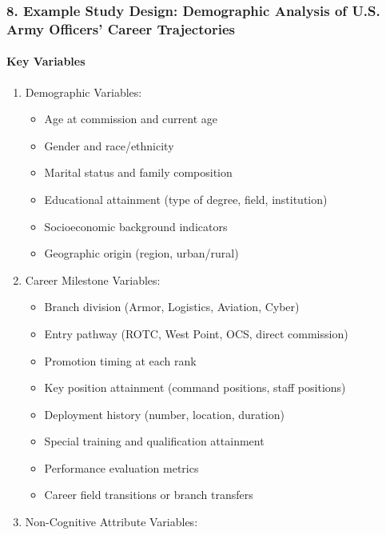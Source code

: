 \documentclass[./main.tex]{subfiles}
\begin{document}
\subsubsection{8. Example Study Design: Demographic Analysis of U.S. Army
Officers' Career
Trajectories}\label{example-study-design-demographic-analysis-of-u.s.-army-officers-career-trajectories}

\paragraph{Key Variables}\label{key-variables}

\begin{enumerate}
\def\labelenumi{\arabic{enumi}.}
\tightlist
\item
  Demographic Variables:

  \begin{itemize}
  \tightlist
  \item
    Age at commission and current age
  \item
    Gender and race/ethnicity
  \item
    Marital status and family composition
  \item
    Educational attainment (type of degree, field, institution)
  \item
    Socioeconomic background indicators
  \item
    Geographic origin (region, urban/rural)
  \end{itemize}
\item
  Career Milestone Variables:

  \begin{itemize}
  \tightlist
  \item
    Branch division (Armor, Logistics, Aviation, Cyber)
  \item
    Entry pathway (ROTC, West Point, OCS, direct commission)
  \item
    Promotion timing at each rank
  \item
    Key position attainment (command positions, staff positions)
  \item
    Deployment history (number, location, duration)
  \item
    Special training and qualification attainment
  \item
    Performance evaluation metrics
  \item
    Career field transitions or branch transfers
  \end{itemize}
\item
  Non-Cognitive Attribute Variables:


\end{enumerate}
\end{document}
